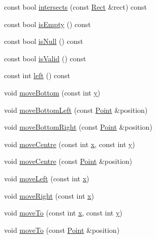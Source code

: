 \begin{DoxyCompactItemize}
const bool \hyperlink{classprism_1_1_rect_a291145fd95310946e84a009646d1540a}{intersects} (const \hyperlink{classprism_1_1_rect}{Rect} \&rect) const 
\item 
const bool \hyperlink{classprism_1_1_rect_aeaebf58b96d705192d3550fb085b5338}{is\+Empty} () const 
\item 
const bool \hyperlink{classprism_1_1_rect_a5bcde85987680d025c52f028fb8cbcea}{is\+Null} () const 
\item 
const bool \hyperlink{classprism_1_1_rect_a7a864d1c2f55c2758d05e23f131a2364}{is\+Valid} () const 
\item 
const int \hyperlink{classprism_1_1_rect_a75ddb96d128ac7b913865be7dbcd865e}{left} () const 
\item 
void \hyperlink{classprism_1_1_rect_ad9305fe8528c64db65ef9bd34c3578b8}{move\+Bottom} (const int \hyperlink{classprism_1_1_rect_a6e951744e0bba0fed781b86ab0be680b}{y})
\item 
void \hyperlink{classprism_1_1_rect_adbbb1cabc46780b605f3400c5ee4e39e}{move\+Bottom\+Left} (const \hyperlink{classprism_1_1_point}{Point} \&position)
\item 
void \hyperlink{classprism_1_1_rect_a88696414c9cbcc840805482d09a83e65}{move\+Bottom\+Right} (const \hyperlink{classprism_1_1_point}{Point} \&position)
\item 
void \hyperlink{classprism_1_1_rect_a4de806d7ddbe4ec946aef7843e5b4ac7}{move\+Centre} (const int \hyperlink{classprism_1_1_rect_a202fa9a56964c9111a968fb9b420f5f4}{x}, const int \hyperlink{classprism_1_1_rect_a6e951744e0bba0fed781b86ab0be680b}{y})
\item 
void \hyperlink{classprism_1_1_rect_a14862b09cf80442e9a4a9996ace251d0}{move\+Centre} (const \hyperlink{classprism_1_1_point}{Point} \&position)
\item 
void \hyperlink{classprism_1_1_rect_af1d84466fd81536d7fcd1a9e3084a8cb}{move\+Left} (const int \hyperlink{classprism_1_1_rect_a202fa9a56964c9111a968fb9b420f5f4}{x})
\item 
void \hyperlink{classprism_1_1_rect_a3da54bd285c3c4aae449b276cca81c29}{move\+Right} (const int \hyperlink{classprism_1_1_rect_a202fa9a56964c9111a968fb9b420f5f4}{x})
\item 
void \hyperlink{classprism_1_1_rect_aa89a93ae63e2fd0dae063509f588f253}{move\+To} (const int \hyperlink{classprism_1_1_rect_a202fa9a56964c9111a968fb9b420f5f4}{x}, const int \hyperlink{classprism_1_1_rect_a6e951744e0bba0fed781b86ab0be680b}{y})
\item 
void \hyperlink{classprism_1_1_rect_a7ee7a73b5cba4d3e3fcd048d77bceaa8}{move\+To} (const \hyperlink{classprism_1_1_point}{Point} \&position)

\end{DoxyCompactItemize}
